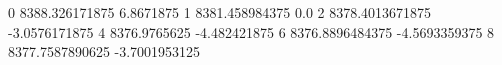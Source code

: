 0 8388.326171875 6.8671875
1 8381.458984375 0.0
2 8378.4013671875 -3.0576171875
4 8376.9765625 -4.482421875
6 8376.8896484375 -4.5693359375
8 8377.7587890625 -3.7001953125
